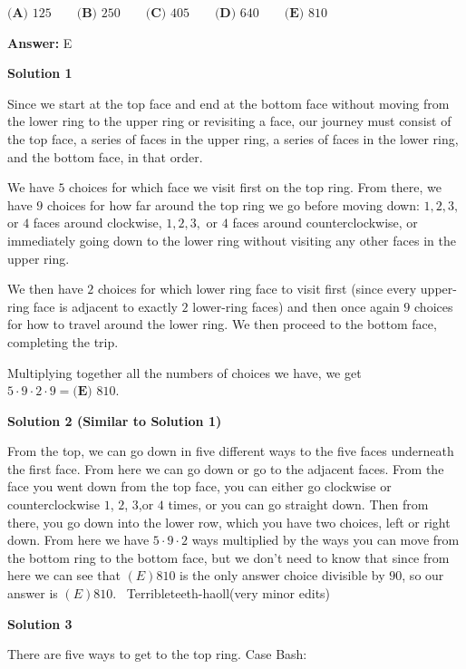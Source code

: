 \begin{enumerate}
$\textbf{(A) } 125 \qquad \textbf{(B) } 250 \qquad \textbf{(C) } 405 \qquad \textbf{(D) } 640 \qquad \textbf{(E) } 810$

 \textbf{Answer: }E



\textbf{Solution 1}

Since we start at the top face and end at the bottom face without moving from the lower ring to the upper ring or revisiting a face, our journey must consist of the top face, a series of faces in the upper ring, a series of faces in the lower ring, and the bottom face, in that order.

 We have $5$ choices for which face we visit first on the top ring. From there, we have $9$ choices for how far around the top ring we go before moving down: $1,2,3,$ or $4$ faces around clockwise, $1,2,3,$ or $4$ faces around counterclockwise, or immediately going down to the lower ring without visiting any other faces in the upper ring.

 We then have $2$ choices for which lower ring face to visit first (since every upper-ring face is adjacent to exactly $2$ lower-ring faces) and then once again $9$ choices for how to travel around the lower ring. We then proceed to the bottom face, completing the trip.

 Multiplying together all the numbers of choices we have, we get $5 \cdot 9 \cdot 2 \cdot 9 = \boxed{\textbf{(E) } 810}$.

 



\textbf{Solution 2 (Similar to Solution 1)}

From the top, we can go down in five different ways to the five faces underneath the first face. From here we can go down or go to the adjacent faces. From the face you went down from the top face, you can either go clockwise or counterclockwise $1$, $2$, $3$,or $4$ times, or you can go straight down. Then from there, you go down into the lower row, which you have two choices, left or right down. From here we have $5 \cdot 9 \cdot 2$ ways multiplied by the ways you can move from the bottom ring to the bottom face, but we don't need to know that since from here we can see that $\boxed{(E) 810}$ is the only answer choice divisible by $90$, so our answer is $\boxed{(E) 810}$. ~Terribleteeth-haoll(very minor edits)

 



\textbf{Solution 3}

There are five ways to get to the top ring. Case Bash:


\end{enumerate}
